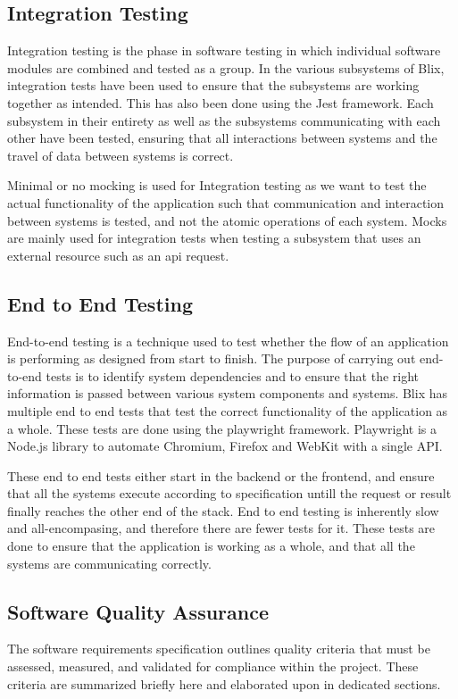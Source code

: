 \documentclass[11pt,a4paper]{article}
\begin{document}
\subsection*{Integration Testing}

Integration testing is the phase in software testing in which individual software modules are combined and tested as a group.
In the various subsystems of Blix, integration tests have been used to ensure that the subsystems are working together as intended. This has also been done using the Jest framework.
Each subsystem in their entirety as well as the subsystems communicating with each other have been tested, ensuring that all interactions between systems and the travel of data between systems is correct.

Minimal or no mocking is used for Integration testing as we want to test the actual functionality of the application such that communication and interaction between systems is tested, and
not the atomic operations of each system. Mocks are mainly used for integration tests when testing a subsystem that uses an external resource such as an api request. 

\subsection*{End to End Testing}

End-to-end testing is a technique used to test whether the flow of an application is performing as designed from start to finish. The purpose of carrying out end-to-end tests is to identify system dependencies and to ensure that the right information is passed between various system components and systems.
Blix has multiple end to end tests that test the correct functionality of the application as a whole. These tests are done using the playwright framework. Playwright is a Node.js library to automate Chromium, Firefox and WebKit with a single API. 

These end to end tests either start in the backend or the frontend, and ensure that all the systems execute according to specification untill the request or result finally reaches the other end of the stack.
End to end testing is inherently slow and all-encompasing, and therefore there are fewer tests for it. These tests are done to ensure that the application is working as a whole, and that all the systems are communicating correctly.

\subsection*{Software Quality Assurance}

The software requirements specification outlines quality criteria that must be assessed, measured, and validated for compliance within the project. 
These criteria are summarized briefly here and elaborated upon in dedicated sections.
\end{document}
